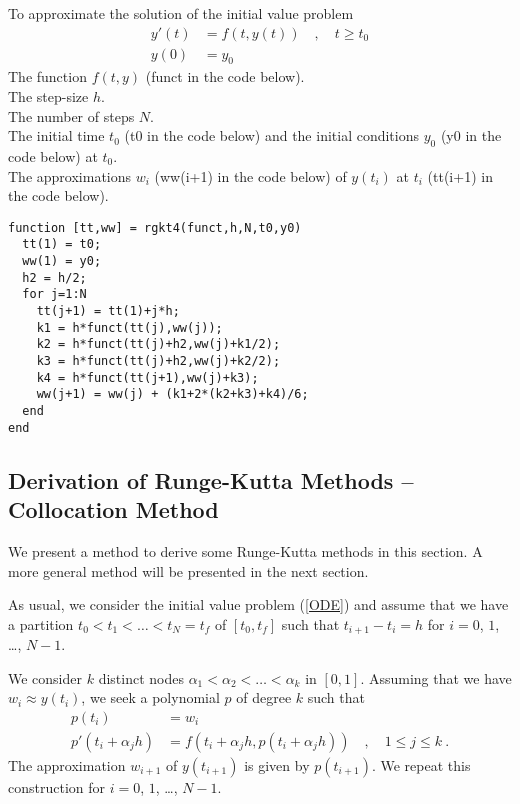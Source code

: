 \begin{code}
To approximate the solution of the initial value problem
\[
\begin{split}
y'(t) &= f(t,y(t)) \quad, \quad t \geq t_0 \\
y(0) &= y_0
\end{split}
\]
 The function $f(t,y)$ (funct in the code below). \\
The step-size $h$.\\
The number of steps $N$.\\
The initial time $t_0$ (t0 in the code below) and the initial
conditions $y_0$ (y0 in the code below) at $t_0$.\\
 The approximations $w_i$ (ww(i+1) in the code below)
of $y(t_i)$ at $t_i$ (tt(i+1) in the code below).
\small
\begin{verbatim}
function [tt,ww] = rgkt4(funct,h,N,t0,y0)
  tt(1) = t0;
  ww(1) = y0;
  h2 = h/2;
  for j=1:N
    tt(j+1) = tt(1)+j*h;
    k1 = h*funct(tt(j),ww(j));
    k2 = h*funct(tt(j)+h2,ww(j)+k1/2);
    k3 = h*funct(tt(j)+h2,ww(j)+k2/2);
    k4 = h*funct(tt(j+1),ww(j)+k3);
    ww(j+1) = ww(j) + (k1+2*(k2+k3)+k4)/6;
  end
end
\end{verbatim}
\label{rgkt4}
\end{code}

\subsection{Derivation of Runge-Kutta Methods -- Collocation
Method}\label{DeRKMCollMeth}

We present a method to derive some Runge-Kutta methods in this
section.  A more general method will be presented in the next section.

As usual, we consider the initial value problem (\ref{ODE})
and assume that we have a partition $t_0 < t_1 < \ldots < t_N = t_f$
of $[t_0,t_f]$ such that $t_{i+1} - t_i = h$ for $i=0$, $1$, \ldots,
$N-1$.

\begin{defn}
We consider $k$ distinct nodes $\alpha_1 < \alpha_2 < \ldots < \alpha_k$
in $[0,1]$.  Assuming that we have $w_i \approx y(t_i)$, we seek a
polynomial $p$ of degree $k$ such that
\[
\begin{split}
p(t_i) &= w_i \\
p'(t_i+\alpha_j h) &= f(t_i+\alpha_j h,p(t_i+\alpha_j h)) \quad ,
\quad 1 \leq j \leq k\ .
\end{split}
\]
The approximation $w_{i+1}$ of $y(t_{i+1})$ is given by $p(t_{i+1})$.
We repeat this construction for $i=0$, $1$, \ldots, $N-1$.
\label{RK_coll}
\end{defn}

